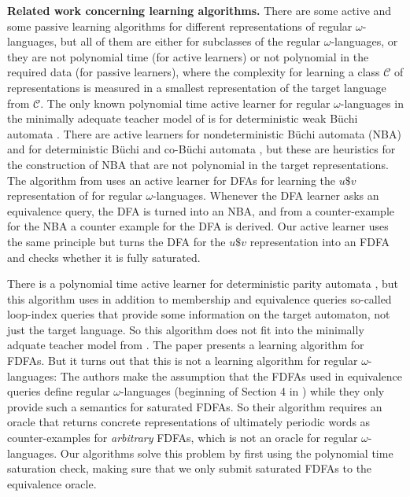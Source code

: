 \documentclass[a4paper,USenglish,cleveref,autoref,thm-restate]{lipics-v2021}
\newcommand{\mc}[1]{\ensuremath{\mathcal{#1}}}
\newcommand{\C}{\mc{C}}
\begin{document}
\smallskip \noindent
\textbf{Related work concerning learning algorithms.}
There are some active and some passive learning algorithms for different representations of regular $\omega$-languages, but all of them are either for subclasses of the regular $\omega$-languages, or they are not polynomial time (for active learners) or not polynomial in the required data (for passive learners), where the complexity for learning a class $\C$ of representations is measured in a smallest representation of the target language from $\C$.
The only known polynomial time active learner for regular $\omega$-languages in the minimally adequate teacher model of \cite{Angluin87} is for deterministic weak Büchi automata \cite{MalerP95}.
There are active learners for nondeterministic Büchi automata (NBA) \cite{FarzanCCTW08,LiCZL21} and for deterministic Büchi and co-Büchi automata \cite{LiST24}, but these are heuristics for the construction of NBA that are not polynomial in the target representations.
The algorithm from \cite{FarzanCCTW08} uses an active learner for DFAs for learning the $u\$v$ representation of \cite{CalbrixNP93} for regular $\omega$-languages. Whenever the DFA learner asks an equivalence query, the DFA is turned into an NBA, and from a counter-example for the NBA a counter example for the DFA is derived. 
Our active learner uses the same principle but turns the DFA for the $u\$v$ representation into an FDFA and checks whether it is fully saturated.

There is a polynomial time active learner for deterministic parity automata \cite{MichaliszynO22}, but this algorithm uses in addition to membership and equivalence queries so-called loop-index queries that provide some information on the target automaton, not just the target language. So this algorithm does not fit into the minimally adquate teacher model from \cite{Angluin87}. The paper \cite{AngluinF16} presents a learning algorithm for FDFAs. But it turns out that this is not a learning algorithm for regular $\omega$-languages: The authors make the assumption that the FDFAs used in equivalence queries define  regular $\omega$-languages (beginning of Section 4 in \cite{AngluinF16}) while they only provide such a semantics for saturated FDFAs. So their algorithm requires an oracle that returns concrete representations of ultimately periodic words as counter-examples for \emph{arbitrary} FDFAs, which is not an oracle for regular $\omega$-languages. Our algorithms solve this problem by first using the polynomial time saturation check, making sure that we only submit saturated FDFAs to the equivalence oracle.
\end{document}
